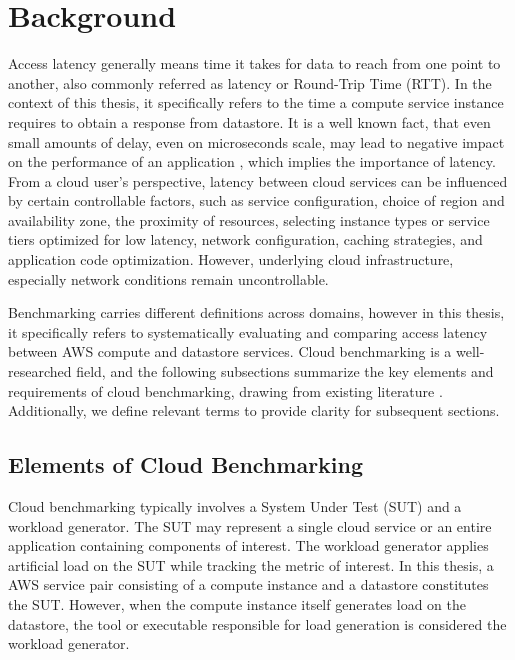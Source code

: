 \section{Background}
\label{cha:background}

Access latency generally means time it takes for data to reach from one point to another, also commonly referred as latency or Round-Trip Time (RTT). In the context of this thesis, it specifically refers to the time a compute service instance requires to obtain a response from datastore. It is a well known fact, that even small amounts of delay, even on microseconds scale, may lead to negative impact on the performance of an application \cite{}, which implies the importance of latency.
%
From a cloud user's perspective, latency between cloud services can be influenced by certain controllable factors, such as service configuration, choice of region and availability zone, the proximity of resources, selecting instance types or service tiers optimized for low latency, network configuration, caching strategies, and application code optimization. However, underlying cloud infrastructure, especially network conditions remain uncontrollable.

Benchmarking carries different definitions across domains, however in this thesis, it specifically refers to systematically evaluating and comparing access latency between AWS compute and datastore services. Cloud benchmarking is a well-researched field, and the following subsections summarize the key elements and requirements of cloud benchmarking, drawing from existing literature \cite{book_bermbach_cloud_service_benchmarking,paper_cooper_ycsb,paper_folkerts_benchmarking,paper_binnig_weather}. Additionally, we define relevant terms to provide clarity for subsequent sections.

\subsection{Elements of Cloud Benchmarking}
\label{elems_of_bench}

Cloud benchmarking typically involves a System Under Test (SUT) and a workload generator. The SUT may represent a single cloud service or an entire application containing components of interest. The workload generator applies artificial load on the SUT while tracking the metric of interest. In this thesis, a AWS service pair consisting of a compute instance and a datastore constitutes the SUT. However, when the compute instance itself generates load on the datastore, the tool or executable responsible for load generation is considered the workload generator.

